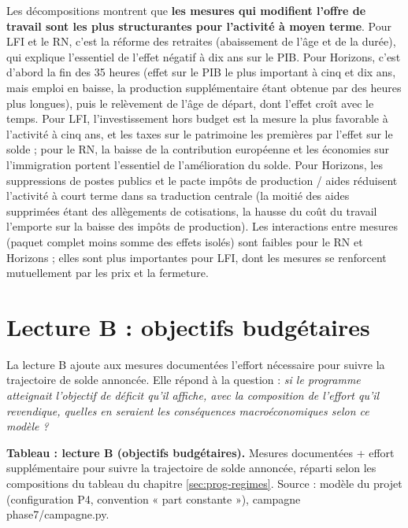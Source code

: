 \documentclass[
  11pt,
  11pt,
  a4paper,
  openany]{book}
\begin{document}
Les décompositions montrent que \textbf{les mesures qui modifient
l'offre de travail sont les plus structurantes pour l'activité à moyen
terme}. Pour LFI et le RN, c'est la réforme des retraites (abaissement
de l'âge et de la durée), qui explique l'essentiel de l'effet négatif à
dix ans sur le PIB. Pour Horizons, c'est d'abord la fin des 35 heures
(effet sur le PIB le plus important à cinq et dix ans, mais emploi en
baisse, la production supplémentaire étant obtenue par des heures plus
longues), puis le relèvement de l'âge de départ, dont l'effet croît avec
le temps. Pour LFI, l'investissement hors budget est la mesure la plus
favorable à l'activité à cinq ans, et les taxes sur le patrimoine les
premières par l'effet sur le solde ; pour le RN, la baisse de la
contribution européenne et les économies sur l'immigration portent
l'essentiel de l'amélioration du solde. Pour Horizons, les suppressions
de postes publics et le pacte impôts de production / aides réduisent
l'activité à court terme dans sa traduction centrale (la moitié des
aides supprimées étant des allègements de cotisations, la hausse du coût
du travail l'emporte sur la baisse des impôts de production). Les
interactions entre mesures (paquet complet moins somme des effets
isolés) sont faibles pour le RN et Horizons ; elles sont plus
importantes pour LFI, dont les mesures se renforcent mutuellement par
les prix et la fermeture.

\hypertarget{sec:lecture-b}{%
\section{Lecture B : objectifs budgétaires}\label{sec:lecture-b}}

La lecture B ajoute aux mesures documentées l'effort nécessaire pour
suivre la trajectoire de solde annoncée. Elle répond à la question :
\emph{si le programme atteignait l'objectif de déficit qu'il affiche,
avec la composition de l'effort qu'il revendique, quelles en seraient
les conséquences macroéconomiques selon ce modèle ?}

\textbf{Tableau : lecture B (objectifs budgétaires).} Mesures
documentées + effort supplémentaire pour suivre la trajectoire de solde
annoncée, réparti selon les compositions du tableau du chapitre
\ref{sec:prog-regimes}. Source : modèle du projet (configuration P4,
convention « part constante »), campagne phase7/campagne.py.
\end{document}
